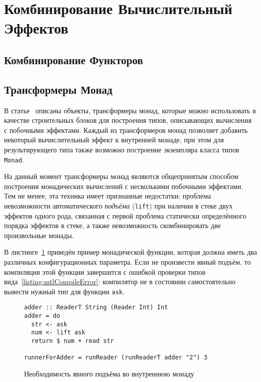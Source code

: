 \section{Комбинирование Вычислительный Эффектов}

\subsection{Комбинирование Функторов}

\subsection{Трансформеры Монад}

В статье~\autocite{MonadTransformers} описаны объекты, трансформеры монад, которые можно использовать в качестве строительных блоков для построения типов, описывающих вычисления с побочными эффектами. Каждый из трансформеров монад позволяет добавить некоторый вычислительный эффект к внутренней монаде, при этом для результирующего типа также возможно построение экземпляра класса типов \lstinline{Monad}.

На данный момент трансформеры монад являются общепринятым способом построения монадических вычислений с несколькими побочными эффектами. Тем не менее, эта техника имеет признанные недостатки: проблема невозможности автоматического \emph{подъёма} (\lstinline{lift}) при наличии в стеке двух эффектов одного рода, связанная с первой проблема статически определённого порядка эффектов в стеке, а также невозможность скомбинировать две произвольные монады. 

В листинге~\ref{listing:mtlReadersLift} приведён пример монадической функции, которая должна иметь два различных конфигурационных параметра. Если не произвести явный подъём, то компиляция этой функции завершится с ошибкой проверки типов вида~\ref{listing:mtlCompileError}: компилятор не в состоянии самостоятельно вывести нужный тип для функции \lstinline{ask}.

\begin{figure}[t]
\begin{lstlisting}
adder :: ReaderT String (Reader Int) Int
adder = do
  str <- ask
  num <- lift ask
  return $ num + read str

runnerForAdder = runReader (runReaderT adder "2") 3
\end{lstlisting}
\caption{Необходимость явного подъёма во внутреннюю монаду}
\label{listing:mtlReadersLift}
\end{figure}

